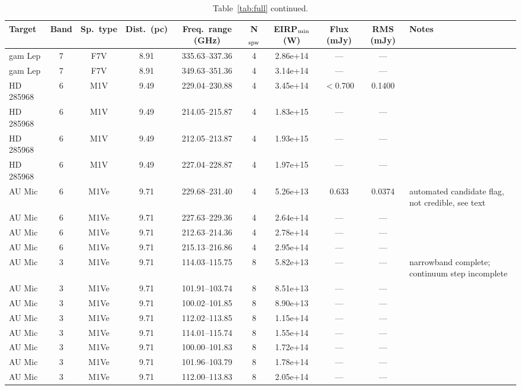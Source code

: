 \documentclass{openjournal}
\begin{document}
\begin{table}
\centering
\scriptsize
\caption{Table~\ref{tab:full} continued.}
\label{tab:full4}
\begin{tabularx}{\textwidth}{@{}l c c c c c c c c X@{}}
\hline
Target & Band & Sp.\ type & Dist.\ (pc) & Freq.\ range (GHz) & N$_{\rm spw}$ & EIRP$_{\rm min}$ (W) & Flux (mJy) & RMS (mJy) & Notes \\
\hline
gam Lep & 7 & F7V & 8.91 & 335.63--337.36 & 4 & 2.86e+14 & --- & --- &  \\
gam Lep & 7 & F7V & 8.91 & 349.63--351.36 & 4 & 3.14e+14 & --- & --- &  \\
HD 285968 & 6 & M1V & 9.49 & 229.04--230.88 & 4 & 3.45e+14 & $<$0.700 & 0.1400 &  \\
HD 285968 & 6 & M1V & 9.49 & 214.05--215.87 & 4 & 1.83e+15 & --- & --- &  \\
HD 285968 & 6 & M1V & 9.49 & 212.05--213.87 & 4 & 1.93e+15 & --- & --- &  \\
HD 285968 & 6 & M1V & 9.49 & 227.04--228.87 & 4 & 1.97e+15 & --- & --- &  \\
AU Mic & 6 & M1Ve & 9.71 & 229.68--231.40 & 4 & 5.26e+13 & 0.633 & 0.0374 & automated candidate flag, not credible, see text \\
AU Mic & 6 & M1Ve & 9.71 & 227.63--229.36 & 4 & 2.64e+14 & --- & --- &  \\
AU Mic & 6 & M1Ve & 9.71 & 212.63--214.36 & 4 & 2.78e+14 & --- & --- &  \\
AU Mic & 6 & M1Ve & 9.71 & 215.13--216.86 & 4 & 2.95e+14 & --- & --- &  \\
AU Mic & 3 & M1Ve & 9.71 & 114.03--115.75 & 8 & 5.82e+13 & --- & --- & narrowband complete; continuum step incomplete \\
AU Mic & 3 & M1Ve & 9.71 & 101.91--103.74 & 8 & 8.51e+13 & --- & --- &  \\
AU Mic & 3 & M1Ve & 9.71 & 100.02--101.85 & 8 & 8.90e+13 & --- & --- &  \\
AU Mic & 3 & M1Ve & 9.71 & 112.02--113.85 & 8 & 1.15e+14 & --- & --- &  \\
AU Mic & 3 & M1Ve & 9.71 & 114.01--115.74 & 8 & 1.55e+14 & --- & --- &  \\
AU Mic & 3 & M1Ve & 9.71 & 100.00--101.83 & 8 & 1.72e+14 & --- & --- &  \\
AU Mic & 3 & M1Ve & 9.71 & 101.96--103.79 & 8 & 1.78e+14 & --- & --- &  \\
AU Mic & 3 & M1Ve & 9.71 & 112.00--113.83 & 8 & 2.05e+14 & --- & --- &  \\

\end{tabularx}
\end{table}
\end{document}
